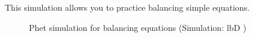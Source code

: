     \noindent
This simulation allows you to practice balancing simple equations.
   \setcounter{subfigure}{0}
	\begin{figure}[H] %
    \textnormal{Phet simulation for balancing equations}\vspace{.1in} \nopagebreak
  \label{m38806*phet!!!underscore!!!sim}\label{m38806*phet-simulation}
             { (Simulation:  lbD )}
      \vspace{2pt}
    \vspace{.1in}
 \end{figure}       
        \par \label{m38726*secfhsst!!!underscore!!!id763}
